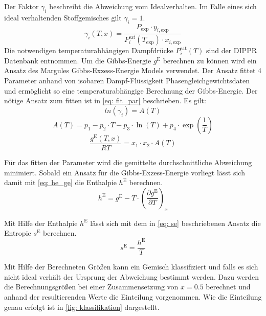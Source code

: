 \documentclass[../thesis.tex]{subfiles}
\begin{document}
Der Faktor $\gamma_i$ beschreibt die Abweichung vom Idealverhalten. Im Falle eines sich ideal verhaltenden Stoffgemisches gilt $\gamma_i = 1$.
\begin{equation}
	\gamma_i \left(T,x \right) = \dfrac{P_{\mathrm{exp}} \cdot y_{i,\mathrm{exp}}}{P_{i}^{\mathrm{sat}}(T_{\mathrm{exp}}) \cdot x_{i,\mathrm{exp}}}
\end{equation}
Die notwendigen temperaturabhängigen Dampfdrücke $P_{i}^{\mathrm{sat}}(T)$ sind der DIPPR Datenbank entnommen.
Um die Gibbs-Energie $g^{\mathrm{E}}$ berechnen zu können wird ein Ansatz des Margules Gibbs-Exzess-Energie Models verwendet. Der Ansatz fittet 4 Parameter anhand von isobaren Dampf-Flüssigkeit Phasengleichgewichtsdaten und ermöglicht so eine temperaturabhängige Berechnung der Gibbs-Energie. Der nötige Ansatz zum fitten ist in \autoref{eq: fit_par} beschrieben. Es gilt:
\begin{equation}
	\label{eq: fit_par}
	ln(\gamma_i) = A(T)
\end{equation}
\begin{equation}
	A(T) = p_1 - p_2 \cdot T-p_3 \cdot \ln(T)+p_4 \cdot \exp{ \left( \dfrac{1}{T} \right)}
\end{equation}
\begin{equation}
	\dfrac{g^{\mathrm{E}}(T,x)}{RT} = x_1 \cdot x_2 \cdot A(T) 
\end{equation}

Für das fitten der Parameter wird die gemittelte durchschnittliche Abweichung minimiert. Sobald ein Ansatz für die Gibbs-Exzess-Energie vorliegt lässt sich damit mit \autoref{eq: he_ge} die Enthalpie $h^{\mathrm{E}}$ berechnen.
\begin{equation}
	\label{eq: he_ge}
	h^{\mathrm{E}} = g^{\mathrm{E}} - T \cdot \left( \dfrac{\partial g^{\mathrm{E}}}{\partial T} \right)_x
\end{equation}

Mit Hilfe der Enthalpie $h^{\mathrm{E}}$ lässt sich mit dem in \autoref{eq: se} beschriebenen Ansatz die Entropie $s^{\mathrm{E}}$ berechnen.
\begin{equation}
	\label{eq: se}
	s^{\mathrm{E}} = \dfrac{h^{\mathrm{E}}}{T}
\end{equation}

Mit Hilfe der Berechneten Größen kann ein Gemisch klassifiziert und falls es sich nicht ideal verhält der Ursprung der Abweichung bestimmt werden. Dazu werden die Berechnungsgrößen bei einer Zusammensetzung von $x=0.5$ berechnet und anhand der resultierenden Werte die Einteilung vorgenommen. Wie die Einteilung genau erfolgt ist in \autoref{fig: klassifikation} dargestellt.
\end{document}

